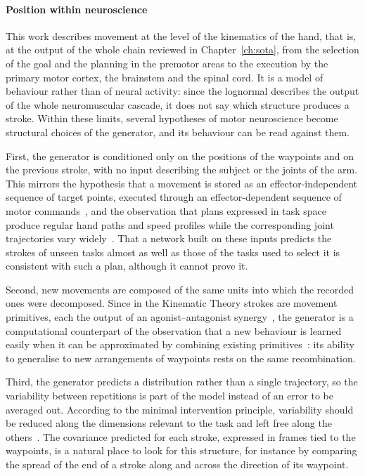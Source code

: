 \documentclass[12pt]{report}
\begin{document}
\paragraph{Position within neuroscience}
This work describes movement at the level of the kinematics of the hand, that is, at the output of the whole chain reviewed in Chapter~\ref{ch:sota}, from the selection of the goal and the planning in the premotor areas to the execution by the primary motor cortex, the brainstem and the spinal cord. It is a model of behaviour rather than of neural activity: since the lognormal describes the output of the whole neuromuscular cascade, it does not say which structure produces a stroke. Within these limits, several hypotheses of motor neuroscience become structural choices of the generator, and its behaviour can be read against them.

First, the generator is conditioned only on the positions of the waypoints and on the previous stroke, with no input describing the subject or the joints of the arm. This mirrors the hypothesis that a movement is stored as an effector-independent sequence of target points, executed through an effector-dependent sequence of motor commands~\cite[pp.~34--38]{senatore2012}, and the observation that plans expressed in task space produce regular hand paths and speed profiles while the corresponding joint trajectories vary widely~\cite[pp.~725--726]{wolpert2021}. That a network built on these inputs predicts the strokes of unseen tasks almost as well as those of the tasks used to select it is consistent with such a plan, although it cannot prove it.

Second, new movements are composed of the same units into which the recorded ones were decomposed. Since in the Kinematic Theory strokes are movement primitives, each the output of an agonist--antagonist synergy~\cite{plamondon2003,woch2004}, the generator is a computational counterpart of the observation that a new behaviour is learned easily when it can be approximated by combining existing primitives~\cite[p.~734]{wolpert2021}: its ability to generalise to new arrangements of waypoints rests on the same recombination.

Third, the generator predicts a distribution rather than a single trajectory, so the variability between repetitions is part of the model instead of an error to be averaged out. According to the minimal intervention principle, variability should be reduced along the dimensions relevant to the task and left free along the others~\cite[pp.~728--729]{wolpert2021}. The covariance predicted for each stroke, expressed in frames tied to the waypoints, is a natural place to look for this structure, for instance by comparing the spread of the end of a stroke along and across the direction of its waypoint.
\end{document}
